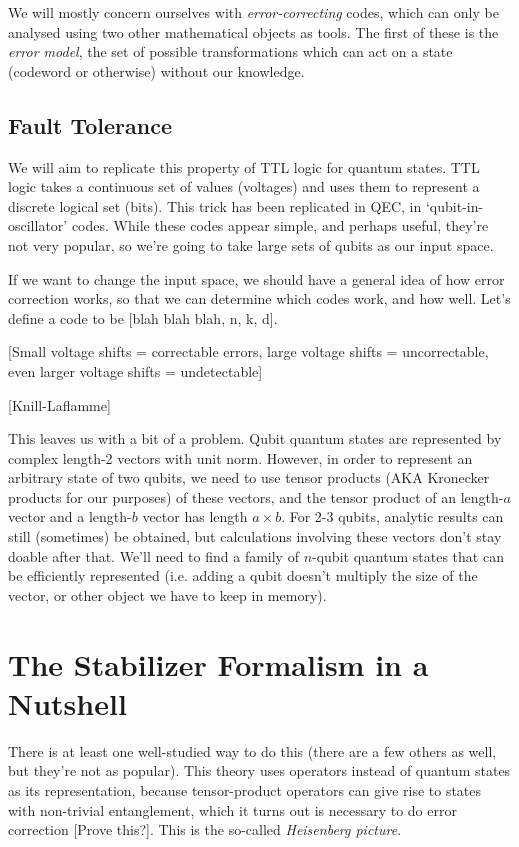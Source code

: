 \documentclass[10pt,a4paper, english]{scrartcl}
\begin{document}
We will mostly concern ourselves with \emph{error-correcting} codes, which can only be analysed using two other mathematical objects as tools.
The first of these is the \emph{error model}, the set of possible transformations which can act on a state (codeword or otherwise) without our knowledge. 
\subsection{Fault Tolerance}
We will aim to replicate this property of TTL logic for quantum states. 
TTL logic takes a continuous set of values (voltages) and uses them to represent a discrete logical set (bits). 
This trick has been replicated in QEC, in `qubit-in-oscillator' codes. 
While these codes appear simple, and perhaps useful, they're not very popular, so we're going to take large sets of qubits as our input space.

If we want to change the input space, we should have a general idea of how error correction works, so that we can determine which codes work, and how well. 
Let's define a code to be [blah blah blah, n, k, d]. 

[Small voltage shifts = correctable errors, large voltage shifts = uncorrectable, even larger voltage shifts = undetectable]

[Knill-Laflamme]

This leaves us with a bit of a problem. 
Qubit quantum states are represented by complex length-2 vectors with unit norm. 
However, in order to represent an arbitrary state of two qubits, we need to use tensor products (AKA Kronecker products for our purposes) of these vectors, and the tensor product of an length-$a$ vector and a length-$b$ vector has length $a \times b$. For 2-3 qubits, analytic results can still (sometimes) be obtained, but calculations involving these vectors don't stay doable after that. 
We'll need to find a family of $n$-qubit quantum states that can be efficiently represented (i.e. adding a qubit doesn't multiply the size of the vector, or other object we have to keep in memory).
\section{The Stabilizer Formalism in a Nutshell}
There is at least one well-studied way to do this (there are a few others as well, but they're not as popular).
This theory uses operators instead of quantum states as its representation, because tensor-product operators can give rise to states with non-trivial entanglement, which it turns out is necessary to do error correction [Prove this?].
This is the so-called \emph{Heisenberg picture}. 
\end{document}
